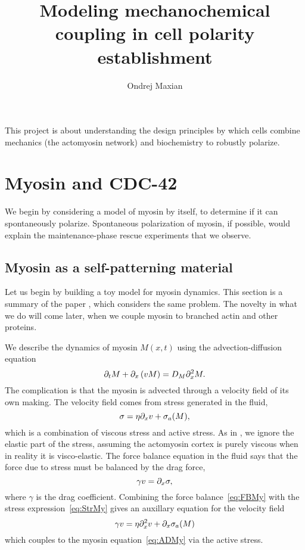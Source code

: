 \documentclass[11pt]{article}
\title{Modeling mechanochemical coupling in cell polarity establishment  \vspace{-0.5 cm}}
\author{Ondrej Maxian  \vspace{-0.75 cm}}
\newcommand{\6}[1]{#1_{\text{6}}}
\newcommand{\3}[1]{#1_{\text{3}}}
\begin{document}
\maketitle
This project is about understanding the design principles by which cells combine mechanics (the actomyosin network) and biochemistry to robustly polarize. 


\section{Myosin and CDC-42}
We begin by considering a model of myosin by itself, to determine if it can spontaneously polarize. Spontaneous polarization of myosin, if possible, would explain the maintenance-phase rescue experiments that we observe.

\subsection{Myosin as a self-patterning material} 
Let us begin by building a toy model for myosin dynamics. This section is a summary of the paper \cite{bois2011pattern}, which considers the same problem. The novelty in what we do will come later, when we couple myosin to branched actin and other proteins. 

We describe the dynamics of myosin $M(x,t)$ using the advection-diffusion equation
\begin{equation}
\label{eq:ADMy}
\partial_t M + \partial_x \left(v M\right) = D_M \partial_x^2 M.
\end{equation}
The complication is that the myosin is advected through a velocity field of its own making. The velocity field comes from stress generated in the fluid, 
\begin{equation}
\label{eq:StrMy}
\sigma = \eta \partial_x{v} + \sigma_a(M),
\end{equation}
which is a combination of viscous stress and active stress. As in \cite{bois2011pattern}, we ignore the elastic part of the stress, assuming the actomyosin cortex is purely viscous when in reality it is visco-elastic. The force balance equation in the fluid says that the force due to stress must be balanced by the drag force, 
\begin{equation}
\label{eq:FBMy}
\gamma v = \partial_x \sigma,
\end{equation}
where $\gamma$ is the drag coefficient. Combining the force balance\ \eqref{eq:FBMy} with the stress expression\ \eqref{eq:StrMy} gives an auxillary equation for the velocity field
\begin{equation}
\gamma v = \eta \partial_x^2 v + \partial_x \sigma_a(M)
\end{equation}
which couples to the myosin equation\ \eqref{eq:ADMy} via the active stress.
\end{document}
